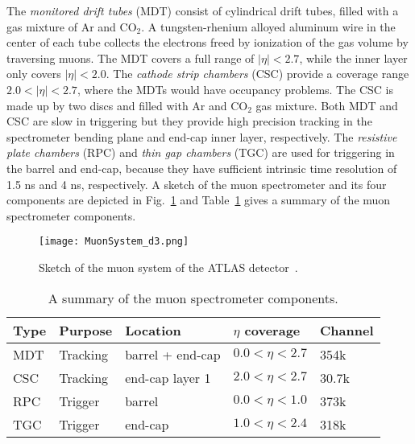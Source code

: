 The \textit{monitored drift tubes} (MDT) consist of cylindrical drift tubes, filled with a gas mixture of Ar and CO$_{2}$.
A tungsten-rhenium alloyed aluminum wire in the center of each tube collects the electrons freed by ionization of the gas volume by traversing muons.
The MDT covers a full range of $|\eta| < 2.7$, while the inner layer only covers $|\eta| < 2.0$.
The \textit{cathode strip chambers} (CSC) provide a coverage range $2.0 < |\eta| < 2.7$, where the MDTs would have occupancy problems.
The CSC is made up by two discs and filled with Ar and CO$_{2}$ gas mixture.
Both MDT and CSC are slow in triggering but they provide high precision tracking in the spectrometer bending plane and end-cap inner layer, respectively.
The \textit{resistive plate chambers} (RPC) and \textit{thin gap chambers} (TGC) are used for triggering in the barrel and end-cap, because they have sufficient intrinsic time resolution of 1.5 ns and 4 ns, respectively.
A sketch of the muon spectrometer and its four components are depicted in Fig.~\ref{fig:ae_muon_spectrometer} and Table~\ref{tab:ae_muon_spectrometer_components} gives a summary of the muon spectrometer components.

\begin{figure}[htbp]
    \begin{center}
        \texttt{[image: MuonSystem\_d3.png]}
        \caption{Sketch of the muon system of the ATLAS detector~\cite{Aad:2008zzm}.}
        \label{fig:ae_muon_spectrometer}
    \end{center}
\end{figure}

\begin{table}[htbp]
    \begin{center}
        {\footnotesize
            \begin{tabular}{lllll}
                \hline
                \hline
                Type & Purpose  & Location         & $\eta$ coverage    & Channel\\
                \hline
                MDT  & Tracking & barrel + end-cap & $0.0 < \eta < 2.7$ & 354k\\
                CSC  & Tracking & end-cap layer 1  & $2.0 < \eta < 2.7$ & 30.7k\\
                RPC  & Trigger  & barrel           & $0.0 < \eta < 1.0$ & 373k\\
                TGC  & Trigger  & end-cap          & $1.0 < \eta < 2.4$ & 318k\\
                \hline
                \hline
            \end{tabular}
        }
    \end{center}
    \caption{A summary of the muon spectrometer components.}
    \label{tab:ae_muon_spectrometer_components}
\end{table}%

